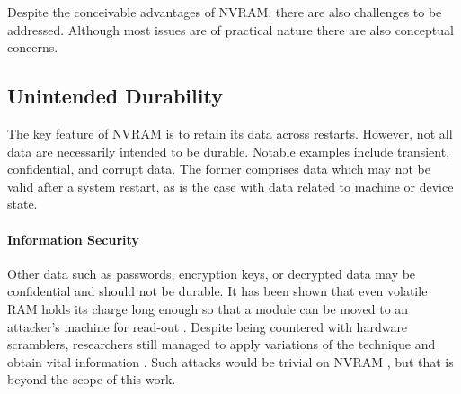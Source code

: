 Despite the conceivable advantages of \ac{NVRAM}, there are also challenges to
be addressed. Although most issues are of practical nature there are also
conceptual concerns.

\subsection{Unintended Durability}

The key feature of \ac{NVRAM} is to retain its data across restarts. However,
not all data are necessarily intended to be durable. Notable examples include
transient, confidential, and corrupt data. The former comprises data which may
not be valid after a system restart, as is the case with data related to machine
or device state.

\paragraph{Information Security}

Other data such as passwords, encryption keys, or decrypted data may be
confidential and should not be durable. It has been shown that even volatile
\ac{RAM} holds its charge long enough so that a module can be moved to an
attacker's machine for read-out \cite{halderman2008lest}. Despite being
countered with hardware scramblers, researchers still managed to apply
variations of the technique and obtain vital information
\cite{yitbarek2017cold}. Such attacks would be trivial on \ac{NVRAM}
\cite{bailey2011operating}, but that is beyond the scope of this work.


